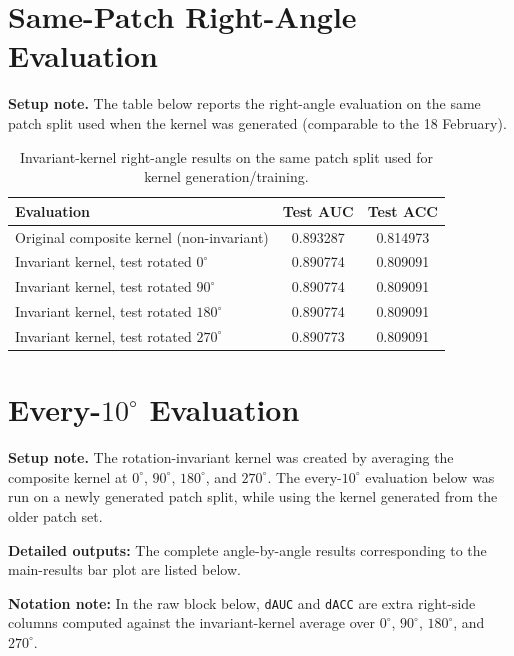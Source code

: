 \documentclass{article}
\begin{document}
\newpage

\appendix
\section{Same-Patch Right-Angle Evaluation}\label{app:same_patch}
\textbf{Setup note.} The table below reports the right-angle evaluation on the same patch split used when the kernel was generated (comparable to the 18 February).

\begin{table}[H]
    \centering
    \begin{tabular}{lcc}
    \toprule
    Evaluation & Test AUC & Test ACC \\
    \midrule
    Original composite kernel (non-invariant) & 0.893287 & 0.814973 \\
    Invariant kernel, test rotated $0^\circ$ & 0.890774 & 0.809091 \\
    Invariant kernel, test rotated $90^\circ$ & 0.890774 & 0.809091 \\
    Invariant kernel, test rotated $180^\circ$ & 0.890774 & 0.809091 \\
    Invariant kernel, test rotated $270^\circ$ & 0.890773 & 0.809091 \\
    \bottomrule
    \end{tabular}
    \caption{Invariant-kernel right-angle results on the same patch split used for kernel generation/training.}
    \label{tab:same_patch_right_angle}
\end{table}

\section{\texorpdfstring{Every-$10^\circ$ Evaluation}{Every-10-degree Evaluation}}\label{app:every10_four}
\textbf{Setup note.} The rotation-invariant kernel was created by averaging the composite kernel at $0^\circ$, $90^\circ$, $180^\circ$, and $270^\circ$. The every-$10^\circ$ evaluation below was run on a newly generated patch split, while using the kernel generated from the older patch set.

\textbf{Detailed outputs:} The complete angle-by-angle results corresponding to the main-results bar plot are listed below.

\textbf{Notation note:} In the raw block below, \texttt{dAUC} and \texttt{dACC} are extra right-side columns computed against the invariant-kernel average over $0^\circ$, $90^\circ$, $180^\circ$, and $270^\circ$.
\end{document}
